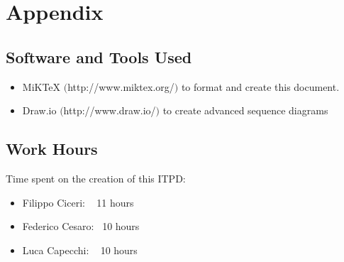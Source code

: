 \section{Appendix}

	\subsection{Software and Tools Used}
	\begin{itemize}
		\item MiKTeX $($http://www.miktex.org/$)$ to format and create this document.
		\item Draw.io $($http://www.draw.io/$)$ to create advanced sequence diagrams
	\end{itemize}

	\subsection{Work Hours}
		Time spent on the creation of this ITPD:
		\begin{itemize}
			\item Filippo Ciceri: ~ 11 hours
			\item Federico Cesaro: ~10 hours
			\item Luca Capecchi: ~ 10 hours
		\end{itemize}

